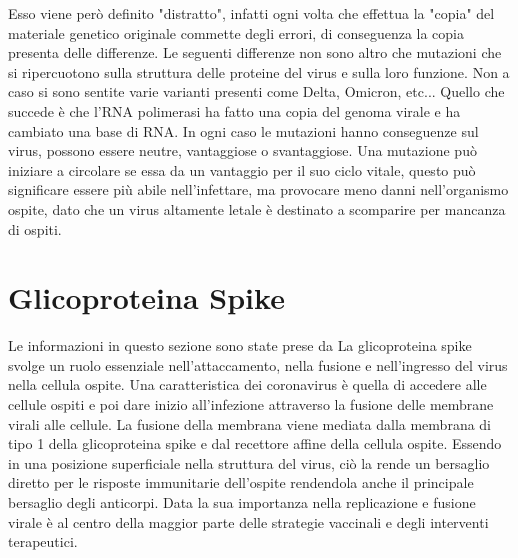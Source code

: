 Esso viene però definito "distratto", infatti ogni volta che effettua la "copia" del materiale genetico originale commette degli errori, di conseguenza la copia presenta delle differenze. Le seguenti differenze non sono altro che mutazioni che si ripercuotono sulla struttura delle proteine del virus e sulla loro funzione. Non a caso si sono sentite varie varianti presenti come Delta, Omicron, etc... Quello che succede è che l'RNA polimerasi ha fatto una copia del genoma virale e ha cambiato una base di RNA. In ogni caso le mutazioni hanno conseguenze sul virus, possono essere neutre, vantaggiose o svantaggiose. Una mutazione può iniziare a circolare se essa da un vantaggio per il suo ciclo vitale, questo può significare essere più abile nell'infettare, ma provocare meno danni nell'organismo ospite, dato che un virus altamente letale è destinato a scomparire per mancanza di ospiti.

\section{Glicoproteina Spike}\label{sec:cap_sec_subsec}
Le informazioni in questo sezione sono state prese da \cite{GlicoproteinaSpike}
La glicoproteina spike svolge un ruolo essenziale nell'attaccamento, nella fusione e nell'ingresso del virus nella cellula ospite. Una caratteristica dei coronavirus è quella di accedere alle cellule ospiti e poi dare inizio all'infezione attraverso la fusione delle membrane virali alle cellule. La fusione della membrana viene mediata dalla membrana di tipo 1 della glicoproteina spike e dal recettore affine della cellula ospite. Essendo in una posizione superficiale nella struttura del virus, ciò la rende un bersaglio diretto per le risposte immunitarie dell'ospite rendendola anche il principale bersaglio degli anticorpi. Data la sua importanza nella replicazione e fusione virale è al centro della maggior parte delle strategie vaccinali e degli interventi terapeutici. 

